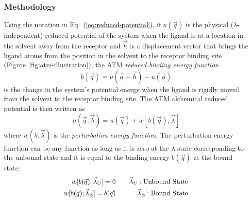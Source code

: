\documentclass[9pt,bestpractices]{livecoms}
\begin{document}
\subsubsection{Methodology}

Using the notation in Eq.~(\ref{eq:reduced-potential}), if $u(\vec{q})$ is the physical ($\lambda$-independent) reduced potential of the system when the ligand is at a location in the solvent away from the receptor and $\vec{h}$ is a displacement vector that brings the ligand atoms from the position in the solvent to the receptor binding site (Figure~\ref{fig:atm-illustration}), the ATM \emph{reduced binding energy function}
\begin{equation}\label{eq:ATM-binding-energy}
b(\vec{q}) = u(\vec{q}+\vec{h}) - u(\vec{q})
\end{equation}
is the change in the system's potential energy when the ligand is rigidly moved from the solvent to the receptor binding site. The ATM alchemical reduced potential is then written as
\begin{equation}\label{eq:ATM-alchemical-potential}
    u(\vec{q}; \vec{\lambda}) = u(\vec{q}) + w[b(\vec{q});\vec{\lambda}]
\end{equation}
where $w(b,\vec{\lambda})$ is the \emph{perturbation energy function}. The perturbation energy function can be any function as long as it is zero at the $\lambda$-state corresponding to the unbound state and it is equal to the binding energy $b(\vec{q})$ at the bound state:
\begin{eqnarray}
    w[b(\vec{q});\vec{\lambda}_{\rm U}] = 0           & \quad & \vec{\lambda}_{\rm U}: {\rm Unbound\ State} \\
    w[b(\vec{q});\vec{\lambda}_{\rm B}] = b(\vec{q})  & \quad & \vec{\lambda}_{\rm B}: {\rm Bound\ State}
\end{eqnarray}
\end{document}

